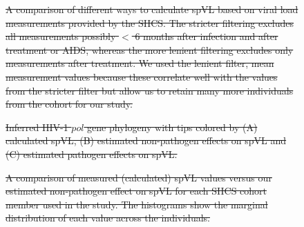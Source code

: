 \documentclass[12pt]{article} %
\providecommand{\DIFdel}[1]{{\protect\color{red}\sout{#1}}}                      %
\providecommand{\DIFdelFL}[1]{\DIFdel{#1}} %
\begin{document}
\begin{doublespace}
\begin{figure}[H]
{%
\DIFdelFL{A comparison of different ways to calculate spVL based on viral load measurements provided by the SHCS. The stricter filtering excludes all measurements possibly $<$ 6 months after infection and after treatment or AIDS, whereas the more lenient filtering excludes only measurements after treatment. We used the lenient filter, mean measurement values because these correlate well with the values from the stricter filter but allow us to retain many more individuals from the cohort for our study.}}

{%
\DIFdelFL{Inferred HIV-1 $pol$ gene phylogeny with tips colored by (A) calculated spVL, (B) estimated non-pathogen effects on spVL and (C) estimated pathogen effects on spVL.}}

{%
\DIFdelFL{A comparison of measured (calculated) spVL values versus our estimated non-pathogen effect on spVL for each SHCS cohort member used in the study. The histograms show the marginal distribution of each value across the individuals.}}


\end{figure}
\end{doublespace}
\end{document}
